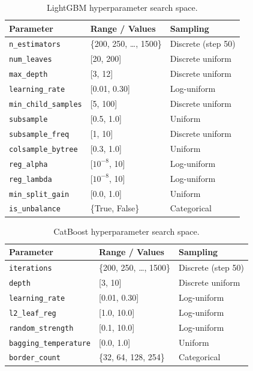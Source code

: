 \documentclass[pdflatex,sn-mathphys-num]{sn-jnl}
\theoremstyle{thmstyleone}
\theoremstyle{thmstyletwo}
\theoremstyle{thmstylethree}
\begin{document}
\begin{table}[t]
  \caption{LightGBM hyperparameter search space.}
  \label{tab:lgb_space}
  \centering
  \begin{tabular}{lll}
    \toprule
    Parameter & Range / Values & Sampling \\
    \midrule
    \texttt{n\_estimators}      & \{200, 250, \ldots, 1500\} & Discrete (step 50) \\
    \texttt{num\_leaves}        & {[}20, 200{]}              & Discrete uniform \\
    \texttt{max\_depth}         & {[}3, 12{]}                & Discrete uniform \\
    \texttt{learning\_rate}     & {[}0.01, 0.30{]}           & Log-uniform \\
    \texttt{min\_child\_samples}& {[}5, 100{]}               & Discrete uniform \\
    \texttt{subsample}          & {[}0.5, 1.0{]}             & Uniform \\
    \texttt{subsample\_freq}    & {[}1, 10{]}                & Discrete uniform \\
    \texttt{colsample\_bytree}  & {[}0.3, 1.0{]}             & Uniform \\
    \texttt{reg\_alpha}         & {[}$10^{-8}$, 10{]}        & Log-uniform \\
    \texttt{reg\_lambda}        & {[}$10^{-8}$, 10{]}        & Log-uniform \\
    \texttt{min\_split\_gain}   & {[}0.0, 1.0{]}             & Uniform \\
    \texttt{is\_unbalance}      & \{True, False\}            & Categorical \\
    \bottomrule
  \end{tabular}
\end{table}

\begin{table}[t]
  \caption{CatBoost hyperparameter search space.}
  \label{tab:cb_space}
  \centering
  \begin{tabular}{lll}
    \toprule
    Parameter & Range / Values & Sampling \\
    \midrule
    \texttt{iterations}          & \{200, 250, \ldots, 1500\} & Discrete (step 50) \\
    \texttt{depth}               & {[}3, 10{]}                & Discrete uniform \\
    \texttt{learning\_rate}      & {[}0.01, 0.30{]}           & Log-uniform \\
    \texttt{l2\_leaf\_reg}       & {[}1.0, 10.0{]}            & Log-uniform \\
    \texttt{random\_strength}    & {[}0.1, 10.0{]}            & Log-uniform \\
    \texttt{bagging\_temperature}& {[}0.0, 1.0{]}             & Uniform \\
    \texttt{border\_count}       & \{32, 64, 128, 254\}       & Categorical \\
    \bottomrule
  \end{tabular}
\end{table}
\end{document}
